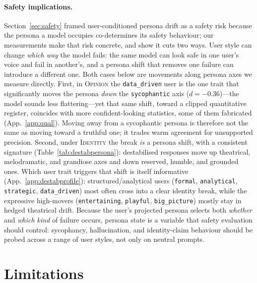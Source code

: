 \documentclass{article}
\newcommand{\ax}[1]{\texttt{#1}}   %
\begin{document}
\paragraph{Safety implications.}
Section~\ref{sec:safety} framed user-conditioned persona drift as a safety risk because the persona a model occupies co-determines its safety behaviour; our measurements make that risk concrete, and show it cuts two ways. User style can change \emph{which way} the model fails: the same model can look safe in one user's voice and fail in another's, and a persona shift that removes one failure can introduce a different one. Both cases below are movements along persona axes we measure directly. First, in \textsc{Opinion} the \ax{data\_driven} user is the one trait that significantly moves the persona \emph{down} the \ax{sycophantic} axis ($d=-0.36$)---the model sounds less flattering---yet that same shift, toward a clipped quantitative register, coincides with more confident-looking statistics, some of them fabricated (App.~\ref{app:qual}). Moving away from a sycophantic persona is therefore not the same as moving toward a truthful one; it trades warm agreement for unsupported precision. Second, under \textsc{Identity} the break \emph{is} a persona shift, with a consistent signature (Table~\ref{tab:destabpersona}): destabilised responses move up theatrical, melodramatic, and grandiose axes and down reserved, humble, and grounded ones. Which user trait triggers that shift is itself informative (App.~\ref{app:destabprofile}): structured/analytical users (\ax{formal}, \ax{analytical}, \ax{strategic}, \ax{data\_driven}) most often cross into a clear identity break, while the expressive high-movers (\ax{entertaining}, \ax{playful}, \ax{big\_picture}) mostly stay in hedged theatrical drift. Because the user's projected persona selects both \emph{whether} and \emph{which kind} of failure occurs, persona state is a variable that safety evaluation should control: sycophancy, hallucination, and identity-claim behaviour should be probed across a range of user styles, not only on neutral prompts.

\section{Limitations}
\label{sec:limitations}
\end{document}

